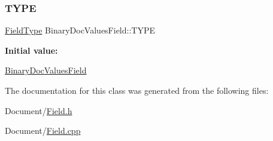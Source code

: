 \subsubsection{\texorpdfstring{T\+Y\+PE}{TYPE}}
{\footnotesize\ttfamily \mbox{\hyperlink{classlucene_1_1core_1_1document_1_1FieldType}{Field\+Type}} Binary\+Doc\+Values\+Field\+::\+T\+Y\+PE\hspace{0.3cm}{\ttfamily [static]}}

{\bfseries Initial value\+:}
\begin{DoxyCode}
\DoxyCodeLine{= []() \{}
\DoxyCodeLine{\}()}
\end{DoxyCode}
\mbox{\hyperlink{classlucene_1_1core_1_1document_1_1BinaryDocValuesField}{Binary\+Doc\+Values\+Field}} 

The documentation for this class was generated from the following files\+:\begin{DoxyCompactItemize}
\item 
Document/\mbox{\hyperlink{Document_2Field_8h}{Field.\+h}}\item 
Document/\mbox{\hyperlink{Field_8cpp}{Field.\+cpp}}\end{DoxyCompactItemize}
